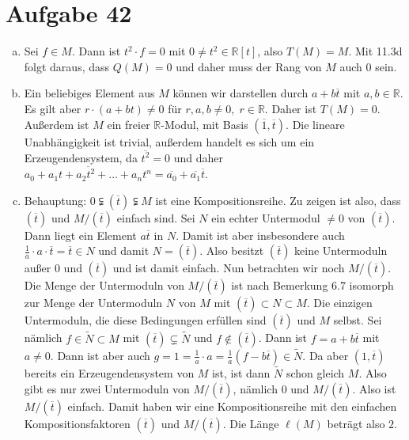 \documentclass{article}
\theoremstyle{definition}
\newcommand{\R}{\mathbb{R}}
\begin{document}
\section*{Aufgabe 42}
\begin{enumerate}[(a)]
    \item Sei $f \in M$. Dann ist $t^2 \cdot f = 0$ mit $0 \neq t^2 \in \R[t]$, also $T(M) = M$. Mit 11.3d folgt daraus, dass $Q(M) = 0$ und daher muss der Rang von $M$ auch $0$ sein.
    \item Ein beliebiges Element aus $M$ können wir darstellen durch $a + b\overline{t}$ mit $a, b\in \R$. Es gilt aber $r\cdot (a + bt) \neq 0$ für $r, a, b\neq 0,\; r\in \R$. Daher ist $T(M) = 0$. Außerdem ist $M$ ein freier $\R$-Modul, mit Basis $(\overline{1},\overline{t})$. Die lineare Unabhängigkeit ist trivial, außerdem handelt es sich um ein Erzeugendensystem, da $\overline{t^2} = 0$ und daher $\overline{a_0 + a_1t + a_2t^2 + \dots + a_nt^n} = \overline{a_0} + \overline{a_1}\overline{t}$. 
    \item Behauptung: $0 \subsetneqq (\overline{t}) \subsetneqq M$ ist eine Kompositionsreihe. Zu zeigen ist also, dass $(\overline{t})$ und $M / (\overline{t})$ einfach sind. Sei $N$ ein echter Untermodul $\neq 0$ von $(\overline{t})$. Dann liegt ein Element $a\overline{t}$ in $N$. Damit ist aber insbesondere auch $\frac{1}{a}\cdot a \cdot \overline{t} = \overline{t}\in N$ und damit $N = (\overline{t})$. Also besitzt $(\overline{t})$ keine Untermoduln außer $0$ und $(\overline{t})$ und ist damit einfach. Nun betrachten wir noch $M/(\overline{t})$. Die Menge der Untermoduln von $M/(\overline{t})$ ist nach Bemerkung 6.7 isomorph zur Menge der Untermoduln $N$ von $M$ mit $(\overline{t})\subset N\subset M$. Die einzigen Untermoduln, die diese Bedingungen erfüllen sind $(\overline{t})$ und $M$ selbst. Sei nämlich $f\in \tilde{N}\subset M$ mit $(\overline{t})\subsetneq \tilde{N}$ und $f\notin (\overline{t})$. Dann ist $f = a + b\overline{t}$ mit $a \neq 0$. Dann ist aber auch $g = 1 = \frac{1}{a} \cdot a = \frac{1}{a}\left(f - b\overline{t}\right) \in \tilde{N}$. Da aber $(1,\overline{t})$ bereits ein Erzeugendensystem von $M$ ist, ist dann $\tilde{N}$ schon gleich $M$. Also gibt es nur zwei Untermoduln von $M /(\overline{t})$, nämlich $0$ und $M/(\overline{t})$. Also ist $M/(\overline{t})$ einfach. Damit haben wir eine Kompositionsreihe mit den einfachen Kompositionsfaktoren $(\overline{t})$ und $M/(\overline{t})$. Die Länge $\ell(M)$ beträgt also $2$.
\end{enumerate}
\end{document}
